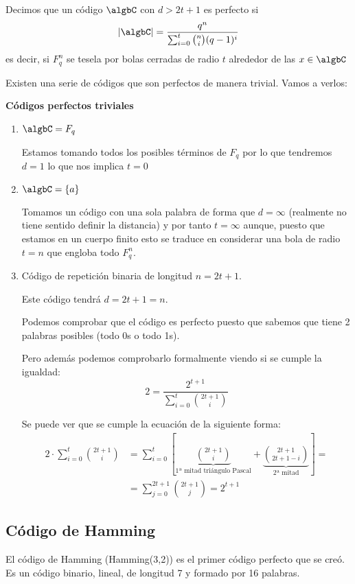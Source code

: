 \begin{defn}
Decimos que un código $\algbC$ con $d>2t+1$ es perfecto si
\[|\algbC| = \frac{q^n}{\sum_{i=0}^t {n \choose i} (q-1)^i}\]
es decir, si $F_q^n$ se tesela por bolas cerradas de radio $t$ alrededor de las $x \in \algbC$
\end{defn}

Existen una serie de códigos que son perfectos de manera trivial. Vamos a verlos:

\textbf{Códigos perfectos triviales}
\begin{enumerate}
\item $\algbC=F_q$

Estamos tomando todos los posibles términos de $F_q$ por lo que tendremos $d=1$ lo que nos implica $t=0$

\item $\algbC=\{a\}$

Tomamos un código con una sola palabra de forma que $d=\infty$ (realmente no tiene sentido definir la distancia) y por tanto $t=\infty$ aunque, puesto que estamos en un cuerpo finito esto se traduce en considerar una bola de radio $t=n$ que engloba todo $F_q^n$.

\item Código de repetición binaria de longitud $n=2t+1$.

Este código tendrá $d=2t+1 =n$.

Podemos comprobar que el código es perfecto puesto que sabemos que tiene 2 palabras posibles (todo 0s o todo 1s).

Pero además podemos comprobarlo formalmente viendo si se cumple la igualdad:
\[ 2 = \frac{2^{t+1}}{\sum_{i=0}^t {2t+1 \choose i} } \]

Se puede ver que se cumple la ecuación de la siguiente forma:
\begin{align*}
    2·\sum_{i=0}^t {2t+1 \choose i} &= \sum_{i=0}^t \left[ \underbrace{2t+1 \choose i}_{\text{1ª mitad triángulo Pascal}} + \underbrace{2t+1 \choose 2t+1-i}_{\text{2ª mitad}} \right] = \\
    &= \sum_{j=0}^{2t+1}{2t+1 \choose j} = 2^{t+1}
\end{align*}

\end{enumerate}

\subsection{Código de Hamming}
\begin{defn}
El código de Hamming (Hamming(3,2)) es el primer código perfecto que se creó. Es un código binario, lineal, de longitud 7 y formado por 16 palabras.
\end{defn}

